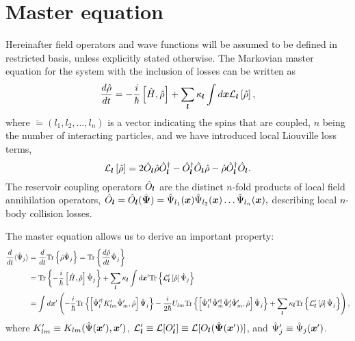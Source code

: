\section{Master equation}

Hereinafter field operators and wave functions will be assumed to be defined in restricted basis, unless explicitly stated otherwise.
The Markovian master equation for the system with the inclusion of losses can be written as~\cite{Jack2002}
\begin{equation}
\label{eqn:wigner-bec:master-eqn:master-eqn}
	\frac{d\hat{\rho}}{dt} =
		- \frac{i}{\hbar} \left[ \hat{H}, \hat{\rho} \right]
		+ \sum_{\boldsymbol{l}} \kappa_{\boldsymbol{l}} \int d\boldsymbol{x}
			\mathcal{L}_{\boldsymbol{l}} \left[ \hat{\rho} \right],
\end{equation}
where $\lvec = (l_1, l_2, \ldots, l_n)$ is a vector indicating the spins that are coupled,
$n$ being the number of interacting particles,
and we have introduced local Liouville loss terms,
\begin{equation}
	\mathcal{L}_{\boldsymbol{l}} \left[ \hat{\rho} \right] =
		2\hat{O}_{\boldsymbol{l}} \hat{\rho} \hat{O}_{\boldsymbol{l}}^\dagger
		- \hat{O}_{\boldsymbol{l}}^\dagger \hat{O}_{\boldsymbol{l}} \hat{\rho}
		- \hat{\rho} \hat{O}_{\boldsymbol{l}}^\dagger \hat{O}_{\boldsymbol{l}}.
\end{equation}
The reservoir coupling operators $\hat{O}_{\boldsymbol{l}}$ are the distinct $n$-fold products of local field annihilation operators,
$\hat{O}_{\boldsymbol{l}} = \hat{O}_{\boldsymbol{l}} (\hat{\boldsymbol{\Psi}}) =
	\hat{\Psi}_{l_{1}} (\boldsymbol{x})
	\hat{\Psi}_{l_{2}} (\boldsymbol{x}) \ldots
	\hat{\Psi}_{l_{n}} (\boldsymbol{x}),$
describing local $n$-body collision losses.

The master equation allows us to derive an important property:
\begin{equation*}
\begin{split}
	\frac{d}{dt} \langle \hat{\Psi}_j \rangle
	& = \frac{d}{dt} \mathrm{Tr} \left\{  \hat{\rho} \hat{\Psi}_j  \right\}
	= \mathrm{Tr} \left\{  \frac{d\hat{\rho}}{dt} \hat{\Psi}_j  \right\} \\
	& = \mathrm{Tr} \left\{  -\frac{i}{\hbar} \left[ \hat{H}, \hat{\rho} \right] \hat{\Psi}_j  \right\}
	+ \sum_{\boldsymbol{l}} \kappa_{\boldsymbol{l}} \int d\boldsymbol{x}^\prime
		\mathrm{Tr} \left\{ 
			\mathcal{L}_{\boldsymbol{l}}^\prime \left[ \hat{\rho} \right]
			\hat{\Psi}_j
		 \right\} \\
	& = \int d\boldsymbol{x}^\prime \left(
		- \frac{i}{\hbar} \mathrm{Tr} \left\{ 
			\left[
				\hat{\Psi}_l^{\prime\dagger} K_{lm}^\prime \hat{\Psi}_m^\prime,
				\hat{\rho}
			\right] \hat{\Psi}_j
		 \right\}
		- \frac{i}{2\hbar} U_{lm} \mathrm{Tr} \left\{ 
			\left[
				\hat{\Psi}_l^{\prime\dagger} \hat{\Psi}_m^{\prime\dagger}
				\hat{\Psi}_l^\prime \hat{\Psi}_m^\prime,
				\hat{\rho}
			\right] \hat{\Psi}_j
		 \right\}
		+ \sum_{\boldsymbol{l}} \kappa_{\boldsymbol{l}}
			\mathrm{Tr} \left\{ 
				\mathcal{L}_{\boldsymbol{l}}^\prime \left[ \hat{\rho} \right]
				\hat{\Psi}_j
			 \right\}
	\right),
\end{split}
\end{equation*}
where $K_{lm}^\prime \equiv K_{lm}(\hat{\Psi}(\boldsymbol{x}^\prime), \boldsymbol{x}^\prime)$,
$\mathcal{L}_{\boldsymbol{l}}^\prime \equiv \mathcal{L} [ O_{\boldsymbol{l}}^\prime ] \equiv \mathcal{L} [ O_{\boldsymbol{l}} ( \hat{\boldsymbol{\Psi}}(\boldsymbol{x}^\prime) ) ]$,
and $\hat{\Psi}_j^\prime \equiv \hat{\Psi}_j (\boldsymbol{x}^\prime)$.

